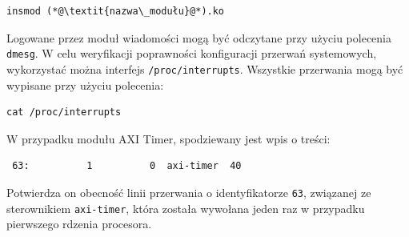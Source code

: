 \begin{lstlisting}
insmod (*@\textit{nazwa\_modułu}@*).ko
\end{lstlisting}

Logowane przez moduł wiadomości mogą być odczytane przy użyciu polecenia \texttt{dmesg}.
W celu weryfikacji poprawności konfiguracji przerwań systemowych, wykorzystać można interfejs \texttt{/proc/interrupts}.
Wszystkie przerwania mogą być wypisane przy użyciu polecenia:

\begin{lstlisting}
cat /proc/interrupts
\end{lstlisting}

W przypadku modułu AXI Timer, spodziewany jest wpis o treści:
\begin{lstlisting}
 63:          1          0  axi-timer  40
\end{lstlisting}
Potwierdza on obecność linii przerwania o identyfikatorze \texttt{63}, związanej ze sterownikiem \texttt{axi-timer}, która została wywołana jeden raz w przypadku pierwszego rdzenia procesora.


